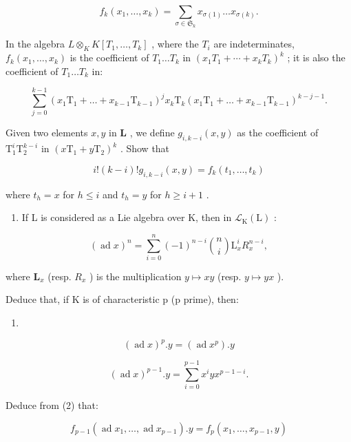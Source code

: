 \[
f _ {k} (x _ {1}, \dots , x _ {k}) = \sum_ {\sigma \in \mathfrak {S}_{k}} x _ {\sigma (1)} \dots x _ {\sigma (k)}.
\]

In the algebra \(L \otimes_{K} K[T_{1}, \ldots, T_{k}]\) , where the \(T_{i}\) are indeterminates, \(f_{k}(x_{1}, \ldots, x_{k})\) is the coefficient of \(T_{1} \ldots T_{k}\) in \((x_{1}T_{1} + \cdots + x_{k}T_{k})^{k}\) ; it is also the coefficient of \(T_{1} \ldots T_{k}\) in:

\[
\sum_ {j = 0} ^ {k - 1} \left(x _ {1} \mathrm{T} _ {1} + \dots + x _ {k - 1} \mathrm{T} _ {k - 1}\right) ^ {j} x _ {k} \mathrm{T} _ {k} \left(x _ {1} \mathrm{T} _ {1} + \dots + x _ {k - 1} \mathrm{T} _ {k - 1}\right) ^ {k - j - 1}.
\]

Given two elements \(x, y\) in \(\mathbf{L}\) , we define \(g_{i,k-i}(x,y)\) as the coefficient of \(\mathrm{T}_1^i\mathrm{T}_2^{k - i}\) in \((x\mathrm{T}_1 + y\mathrm{T}_2)^k\) . Show that

\[
i! (k - i)! g _ {i, k - i} (x, y) = f _ {k} \left(t _ {1}, \dots , t _ {k}\right)
\]

where \(t_h = x\) for \(h \leqslant i\) and \(t_h = y\) for \(h \geqslant i + 1\) .

\begin{enumerate}
\def\labelenumi{(\alph{enumi})}
\setcounter{enumi}{1}
\tightlist
\item
  If L is considered as a Lie algebra over K, then in \(\mathcal{L}_{\mathrm{K}}(\mathrm{L})\) :
\end{enumerate}

\[
(\operatorname{ad} x) ^ {n} = \sum_ {i = 0} ^ {n} (- 1) ^ {n - i} \binom {n} {i} \mathrm{L} _ {x} ^ {i} R _ {x} ^ {n - i},
\]

where \(\mathbf{L}_x\) (resp. \(R_{x}\) ) is the multiplication \(y\mapsto xy\) (resp. \(y\mapsto yx\) ).

Deduce that, if K is of characteristic p (p prime), then:

\begin{enumerate}
\def\labelenumi{(\arabic{enumi})}
\tightlist
\item
\end{enumerate}

\[
(\operatorname{ad} x) ^ {p}. y = (\operatorname{ad} x ^ {p}). y\tag{2}
\]

\[
(\operatorname{ad} x) ^ {p - 1}. y = \sum_ {i = 0} ^ {p - 1} x ^ {i} y x ^ {p - 1 - i}.
\]

Deduce from (2) that:

\[
f _ {p - 1} (\operatorname{ad} x _ {1}, \dots , \operatorname{ad} x _ {p - 1}). y = f _ {p} (x _ {1}, \dots , x _ {p - 1}, y)
\]

